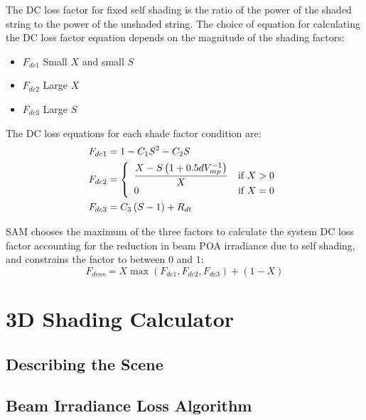 \documentclass[12pt,letterpaper]{article}
\begin{document}
The DC loss factor for fixed self shading is the ratio of the power of the shaded string to the power of the unshaded string. The choice of equation for calculating the DC loss factor equation depends on the magnitude of the shading factors:
\begin{itemize}
\item $F_{dc1}$ \quad Small $X$ and small $S$
\item $F_{dc2}$ \quad Large $X$
\item $F_{dc3}$ \quad Large $S$
\end{itemize}

The DC loss equations for each shade factor condition are:
\begin{align}
F_{dc1} &= 1-C_1S^2-C_2S \notag\\ %
F_{dc2} &= 
\left\{
   \begin{array}{ll}
      \dfrac{X-S\left(1+0.5 d V^{-1}_{mp}\right)}{X} & \text{if $X>0$}\\
      0 & \text{if $X=0$}\\
   \end{array}
\right. \notag\\ %
F_{dc3} &= C_3\left(S-1\right)+R_{dt} %
\end{align}

SAM chooses the maximum of the three factors to calculate the system DC loss factor accounting for the reduction in beam POA irradiance due to self shading, and constrains the factor to between $0$ and $1$:
\begin{equation}\label{eqn-selfshadedcderate}
F_{dcss}=X\max\left(F_{dc1},F_{dc2},F_{dc3}\right)+(1-X)
\end{equation}
\chapter{3D Shading Calculator}\label{sec-3d-shading}

\section{Describing the Scene}

\section{Beam Irradiance Loss Algorithm}
\end{document}
